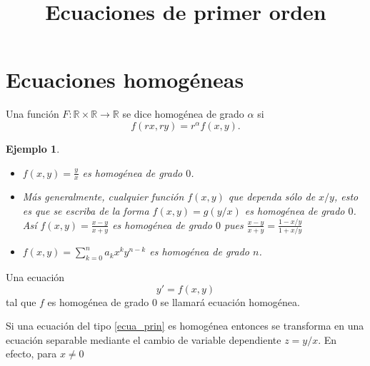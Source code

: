 \documentclass{article}
\title{Ecuaciones de primer orden}
\newcommand{\rr}{\mathbb{R}}
\newtheorem{ejemplo}{Ejemplo}}
\begin{document}
  \maketitle







\tableofcontents











\section{Ecuaciones homogéneas}

\begin{definicion}
 Una función $F:\rr\times\rr\to\rr$ se dice homogénea de grado $\alpha$ si 
 \[f(rx,ry)=r^{\alpha}f(x,y).\]
\end{definicion}

\begin{ejemplo}

\begin{itemize}
                 \item $f(x,y)=\tfrac{y}{x}$ es homogénea de grado $0$.
                 \item Más generalmente, cualquier función $f(x,y)$ que dependa sólo de $x/y$, esto es que se escriba de la forma $f(x,y)=g(y/x)$
                 es homogénea de grado  $0$. Así $f(x,y)=\tfrac{x-y}{x+y}$ es homogénea de grado $0$ pues $\tfrac{x-y}{x+y}= \tfrac{1-x/y}{1+x/y}$
                 \item $f(x,y)=\sum_{k=0}^na_kx^ky^{n-k}$ es homogénea de grado $n$.
\end{itemize}
\end{ejemplo}



\begin{definicion}
 Una ecuación 
 \begin{equation}\label{ecua_prin}y'=f(x,y)\end{equation}
 tal que $f$ es homogénea de grado $0$ se llamará ecuación homogénea.
\end{definicion}

Si una ecuación del tipo \eqref{ecua_prin} es homogénea entonces se transforma en una ecuación separable mediante el cambio de variable dependiente $\boxed{z=y/x}$. En efecto, para $x\neq 0$
\end{document}
